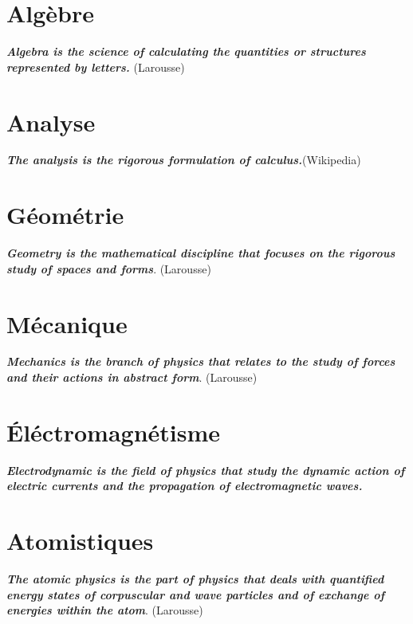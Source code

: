 \documentclass[12pt,a4paper,twoside,openright]{report}
\theoremstyle{definition}
\theoremstyle{itexmp}
\numberwithin{equation}{section}
\begin{document}
	
  \chapter{Algèbre}

	\textit{\textbf{Algebra is the science of calculating the quantities or structures represented by letters.}} (Larousse)
	\minitoc
	
	
		
 \chapter{Analyse}

	\textit{\textbf{The analysis is the rigorous formulation of calculus.}}(Wikipedia)
	\minitoc
	\pagebreak
	
		
\chapter{Géométrie}

	\textit{\textbf{Geometry is the mathematical discipline that focuses on the rigorous study of spaces and forms}}. (Larousse)
	\minitoc
	\pagebreak
	
	
   \chapter{Mécanique}

	\textit{\textbf{Mechanics is the branch of physics that relates to the study of forces and their actions in abstract form}}. (Larousse)
	\minitoc
	
	
\chapter{Éléctromagnétisme}

	\textit{\textbf{Electrodynamic is the field of physics that study the dynamic action of electric currents and the propagation of electromagnetic waves.}}
	\minitoc
	\pagebreak
	

\chapter{Atomistiques}

	\textit{\textbf{The atomic physics is the part of physics that deals with quantified energy states of corpuscular and wave particles and of exchange of energies within the atom}}. (Larousse)
	\minitoc
	\pagebreak
	
	
\end{document}

